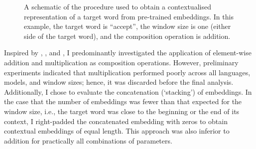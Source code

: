 \begin{figure}
  \centering
  \newcommand{\period}{\text{.}}
  \newcommand*{\orawidest}{accept}
  \newcommand*{\oratallest}{\#\#}
  \newlength{\orawidth}
  \settowidth{\orawidth}{\orawidest}
  \newcommand*{\ora}[1]{\overrightarrow{#1\vphantom{\oratallest}}}
  \caption{A schematic of the procedure used
    to obtain a contextualised representation of a target word from pre-trained embeddings.
    In this example, the target word is ``accept'', the window size is one (either side of
    the target word), and the composition operation is addition.
  }
  \label{chart:schematic-procedure}
\end{figure}

Inspired by \textcite{Landauer1997}, \textcite{Kintsch2001}, and
\textcite{Mitchell2008}, I predominantly investigated the application of element-wise
addition and multiplication as composition operations.
However, preliminary experiments indicated that multiplication performed poorly across
all languages, models, and window sizes; hence, it was discarded before the final
analysis.
Additionally, I chose to evaluate the concatenation (`stacking') of embeddings.
In the case that the number of embeddings was fewer than that expected for the window
size, i.e., the target word was close to the beginning or the end of its context, I
right-padded the concatenated embedding with zeros to obtain contextual embeddings of
equal length.
This approach was also inferior to addition for practically all combinations of
parameters.

